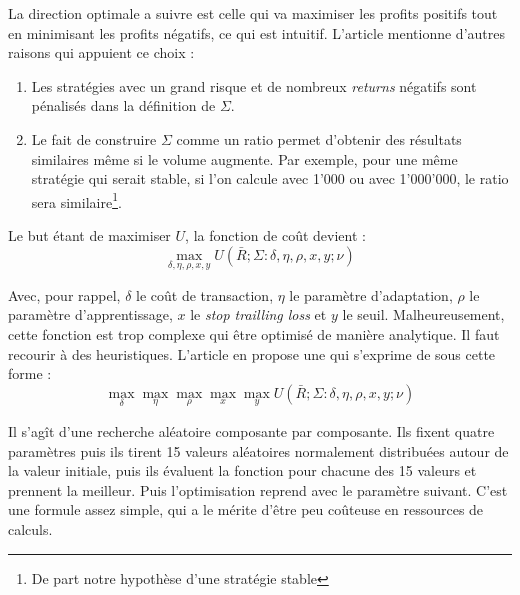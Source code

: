 \documentclass[a4paper, 11pt]{article}
\begin{document}
La direction optimale a suivre est celle qui va maximiser les profits positifs tout en minimisant les profits négatifs, ce qui est intuitif.
L'article mentionne d'autres raisons qui appuient ce choix \cite{fx_trading}:
\begin{enumerate}
 \item Les stratégies avec un grand risque et de nombreux \textit{returns} négatifs sont pénalisés dans la définition de $\Sigma$.
 \item Le fait de construire $\Sigma$ comme un ratio permet d'obtenir des résultats similaires même si le volume augmente. Par exemple, pour une même
 stratégie qui serait stable, si l'on calcule avec 1'000 ou avec 1'000'000, le ratio sera similaire\footnote{De part notre hypothèse d'une stratégie stable}.
\end{enumerate}

Le but étant de maximiser $U$, la fonction de coût devient :
$$\max\limits_{\delta, \eta, \rho, x, y} U(\bar{R};\Sigma : \delta, \eta, \rho, x, y; \nu)$$

Avec, pour rappel, $\delta$ le coût de transaction, $\eta$ le paramètre d'adaptation, $\rho$ le paramètre d'apprentissage, $x$ le \textit{stop trailling
loss} et $y$ le seuil. Malheureusement, cette fonction est trop complexe qui être optimisé de manière analytique. Il faut recourir à des heuristiques.
L'article en propose une qui s'exprime de sous cette forme :
$$\max\limits_{\delta} \max\limits_{\eta} \max\limits_{\rho} \max\limits_{x} \max\limits_{y} U(\bar{R};\Sigma : \delta, \eta, \rho, x, y; \nu)$$

Il s'agît d'une recherche aléatoire composante par composante. Ils fixent quatre paramètres puis ils tirent 15 valeurs aléatoires normalement distribuées
autour de la valeur initiale, puis ils évaluent la fonction pour chacune des 15 valeurs et prennent la meilleur. Puis l'optimisation reprend avec le 
paramètre suivant. C'est une formule assez simple, qui a le mérite d'être peu coûteuse en ressources de calculs.
\end{document}
